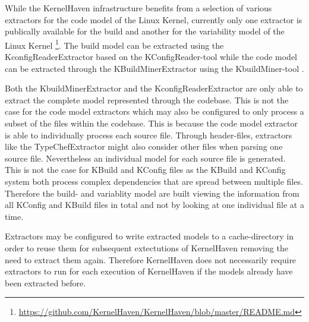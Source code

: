 \documentclass[a4paper]{article}
\begin{document}
While the KernelHaven infrastructure benefits from a selection of various extractors for the code model of the Linux Kernel, currently only one extractor is publically available for the build and another for the variability model of the Linux Kernel \footnote{\url{https://github.com/KernelHaven/KernelHaven/blob/master/README.md}}. The build model can be extracted using the KconfigReaderExtractor based on the KConfigReader-tool \cite{ck-kconfig} while the code model can be extracted through the KBuildMinerExtractor using the KbuildMiner-tool \cite{ck-kbuild}.

Both the KbuildMinerExtractor and the KconfigReaderExtractor are only able to extract the complete model represented through the codebase. This is not the case for the code model extractors which may also be configured to only process a subset of the files within the codebase. This is because the code model extractor is able to individually process each source file. Through header-files, extractors like the TypeChefExtractor might also consider other files when parsing one source file. Nevertheless an individual model for each source file is generated. This is not the case for KBuild and KConfig files as the KBuild and KConfig system both process complex dependencies that are spread between multiple files. Therefore the build- and variablity model are built viewing the information from all KConfig and KBuild files in total and not by looking at one individual file at a time.

Extractors may be configured to write extracted models to a cache-directory in order to reuse them for subsequent extectutions of KernelHaven removing the need to extract them again. Therefore KernelHaven does not necessarily require extractors to run for each execution of KernelHaven if the models already have been extracted before.
\end{document}
